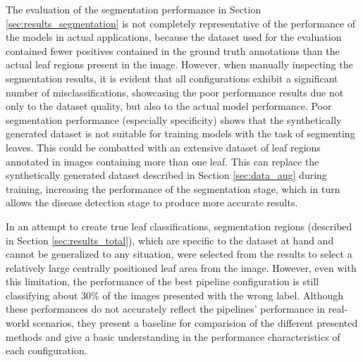 \documentclass[draft,final]{vutinfth} %
\begin{document}
The evaluation of the segmentation performance in Section \ref{sec:results_segmentation} is not completely representative of the performance of the models in actual applications, because the dataset used for the evaluation contained fewer positives contained in the ground truth annotations than the actual leaf regions present in the image. However, when manually inspecting the segmentation results, it is evident that all configurations exhibit a significant number of misclassifications, showcasing the poor performance results due not only to the dataset quality, but also to the actual model performance. 
Poor segmentation performance (especially specificity) shows that the synthetically generated dataset is not suitable for training models with the task of segmenting leaves. This could be combatted with an extensive dataset of leaf regions annotated in images containing more than one leaf. This can replace the synthetically generated dataset described in Section \ref{sec:data_aug} during training, increasing the performance of the segmentation stage, which in turn allows the disease detection stage to produce more accurate results. 

In an attempt to create true leaf classifications, segmentation regions (described in Section \ref{sec:results_total}), which are specific to the dataset at hand and cannot be generalized to any situation, were selected from the results to select a relatively large centrally positioned leaf area from the image. However, even with this limitation, the performance of the best pipeline configuration is still classifying about 30\% of the images presented with the wrong label. Although these performances do not accurately reflect the pipelines' performance in real-world scenarios, they present a baseline for comparision of the different presented methods and give a basic understanding in the performance characteristics of each configuration.
\end{document}
